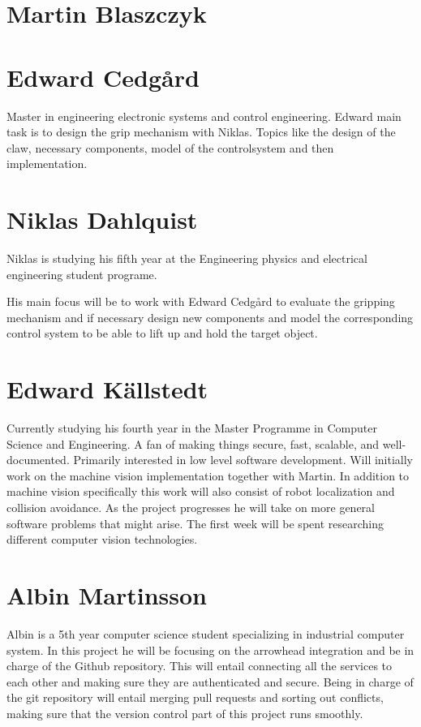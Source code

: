
\section*{Martin Blaszczyk}


\section*{Edward Cedgård}
Master in engineering electronic systems and control engineering.
Edward main task is to design the grip mechanism with Niklas. Topics like
the design of the claw, necessary components, model of the controlsystem and then implementation. 

\section*{Niklas Dahlquist}
Niklas is studying his fifth year at the Engineering physics and electrical engineering student programe.

His main focus will be to work with Edward Cedgård to evaluate the gripping mechanism and if necessary design new components and model the corresponding control system to be able to lift up and hold the target object.
\section*{Edward Källstedt}
Currently studying his fourth year in the Master Programme in Computer Science and Engineering.
A fan of making things secure, fast, scalable, and well-documented. Primarily interested in
low level software development. Will initially work on the machine vision implementation 
together with Martin. In addition to machine vision specifically this work will also consist
of robot localization and collision avoidance. As the project progresses he will take on more
general software problems that might arise. The first week will be spent researching different
computer vision technologies.

\section*{Albin Martinsson}
Albin is a 5th year computer science student specializing in industrial computer system. In this project he will be focusing on the 
arrowhead integration and be in charge of the Github repository. This will entail connecting all the services to each other and
making sure they are authenticated and secure. Being in charge of the git repository will entail merging pull requests and sorting
out conflicts, making sure that the version control part of this project runs smoothly.

